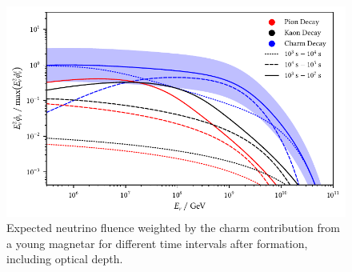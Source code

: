 \begin{figure}[H]
	\centering
	\includegraphics{../plots/build/magnetar_integrated_neutrino_spectrum_with.pdf}
	\caption[Magnetar $\nu \kern+0.5pt$ fluence compared to $c$ decay with optical depth.]
			{Expected neutrino fluence weighted by the charm contribution from a young magnetar for different time
			 intervals after formation, including optical depth.}
	\label{fig:magnetar-fluence-with}
\end{figure}
